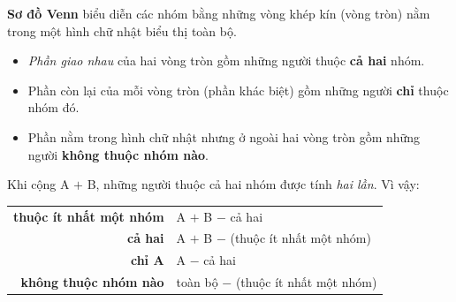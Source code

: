 \documentclass[11pt]{article}
\renewcommand{\arraystretch}{1.35}
\begin{document}
\newcommand{\stpVennIIIx}[2]{%
\begin{tikzpicture}[font=\small]
\fill[tmBlue!30,fill opacity=0.55] (-0.7,0.4) circle (1.15);
\fill[tmOrange!35,fill opacity=0.55] (0.7,0.4) circle (1.15);
\fill[tmGreen!30,fill opacity=0.55] (0,-0.8) circle (1.15);
\draw[line width=0.9pt,tmBlue!80!black] (-0.7,0.4) circle (1.15);
\draw[line width=0.9pt,tmOrange!85!black] (0.7,0.4) circle (1.15);
\draw[line width=0.9pt,tmGreen!70!black] (0,-0.8) circle (1.15);
\draw[line width=0.8pt,Slate,rounded corners=4pt] (-4.0,-2.3) rectangle (4.0,1.85);
\node[font=\footnotesize\bfseries,text=tmBlue!80!black,anchor=east] at (-1.85,1.0) {\stpVa};
\node[font=\footnotesize\bfseries,text=tmOrange!85!black,anchor=west] at (1.85,1.0) {\stpVb};
\node[font=\footnotesize\bfseries,text=tmGreen!60!black,anchor=west] at (1.2,-1.65) {\stpVc};
\node at (-1.25,0.65) {\stpVd}; \node at (1.25,0.65) {\stpVe}; \node at (0,-1.45) {\stpVf};
\node at (0,0.98) {\stpVg}; \node at (-0.72,-0.45) {\stpVh}; \node at (0.72,-0.45) {\stpVi};
\node at (0,0.05) {#1};
\node[anchor=south west,font=\footnotesize] at (-3.9,-2.25) {#2};
\end{tikzpicture}}
\begin{knowbox}
\textbf{Sơ đồ Venn} biểu diễn các nhóm bằng những vòng khép kín (vòng tròn) nằm trong một hình chữ nhật biểu thị toàn bộ.
\begin{center}
\end{center}
\begin{itemize}[leftmargin=1.4em,itemsep=3pt]
\item \emph{Phần giao nhau} của hai vòng tròn gồm những người thuộc \textbf{cả hai} nhóm.
\item Phần còn lại của mỗi vòng tròn (phần khác biệt) gồm những người \textbf{chỉ} thuộc nhóm đó.
\item Phần nằm trong hình chữ nhật nhưng ở ngoài hai vòng tròn gồm những người \textbf{không thuộc nhóm nào}.
\end{itemize}
Khi cộng A $+$ B, những người thuộc cả hai nhóm được tính \emph{hai lần}. Vì vậy:
\begin{center}
\renewcommand{\arraystretch}{1.3}
\begin{tabular}{@{}r@{\ $=$\ }l@{}}
\textbf{thuộc ít nhất một nhóm} & A $+$ B $-$ cả hai\\
\textbf{cả hai} & A $+$ B $-$ (thuộc ít nhất một nhóm)\\
\textbf{chỉ A} & A $-$ cả hai\\
\textbf{không thuộc nhóm nào} & toàn bộ $-$ (thuộc ít nhất một nhóm)\\
\end{tabular}
\end{center}
\end{knowbox}
\end{document}
